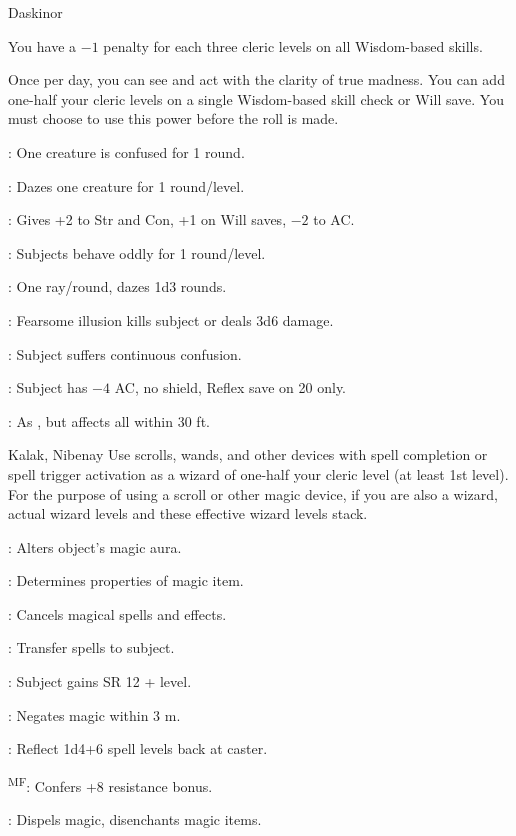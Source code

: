 {Daskinor}
{You have a $-1$ penalty for each three cleric levels on all Wisdom-based skills.

Once per day, you can see and act with the clarity of true madness. You can add one-half your cleric levels on a single Wisdom-based skill check or Will save. You must choose to use this power before the roll is made.}
{
	\item {}: One creature is confused for 1 round.
	\item {}: Dazes one creature for 1 round/level.
	\item {}: Gives +2 to Str and Con, +1 on Will saves, $-2$ to AC.
	\item {}: Subjects behave oddly for 1 round/level.
	\item {}: One ray/round, dazes 1d3 rounds.
	\item {}: Fearsome illusion kills subject or deals 3d6 damage.
	\item {}: Subject suffers continuous confusion.
	\item {}: Subject has $-4$ AC, no shield, Reflex save on 20 only.
	\item {}: As , but affects all within 30 ft.
}

{Kalak, Nibenay}
{Use scrolls, wands, and other devices with spell completion or spell trigger activation as a wizard of one-half your cleric level (at least 1st level). For the purpose of using a scroll or other magic device, if you are also a wizard, actual wizard levels and these effective wizard levels stack.}
{
	\item {}: Alters object's magic aura.
	\item {}: Determines properties of magic item.
	\item {}: Cancels magical spells and effects.
	\item {}: Transfer spells to subject.
	\item {}: Subject gains SR 12 + level.
	\item {}: Negates magic within 3 m.
	\item {}: Reflect 1d4+6 spell levels back at caster.
	\item {}\textsuperscript{M}\textsuperscript{F}: Confers +8 resistance bonus.
	\item {}: Dispels magic, disenchants magic items.
}

